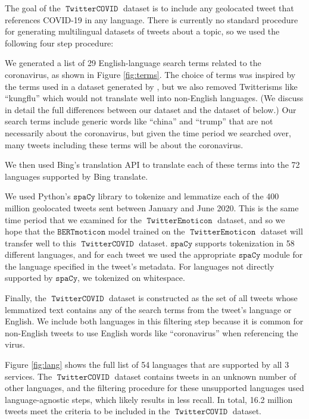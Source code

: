\documentclass[11pt]{article}
\newcommand{\bertmoji}{\texttt{BERTmoticon}}
\newcommand{\spacy}{\texttt{spaCy}}
\DeclareMathOperator{\emoticon}{\texttt{TwitterEmoticon}}
\DeclareMathOperator{\corona}{\texttt{TwitterCOVID}}
\begin{document}
The goal of the $\corona$ dataset is to include any geolocated tweet that references COVID-19 in any language.
There is currently no standard procedure for generating multilingual datasets of tweets about a topic,
so we used the following four step procedure:
\begin{enumerate*}[label=(\arabic*)]
\item
    We generated a list of 29 English-language search terms related to the coronavirus,
    as shown in Figure \ref{fig:terms}.
    The choice of terms was inspired by the terms used in a dataset generated by \citet{chen2020tracking},
    but we also removed Twitterisms like ``kungflu'' which would not translate well into non-English languages.
        (We discuss in detail the full differences between our dataset and the dataset of \citet{chen2020tracking} below.)
    Our search terms include generic words like ``china'' and ``trump'' that are not necessarily about the coronavirus,
    but given the time period we searched over,
    many tweets including these terms will be about the coronavirus.
\item
    We then used Bing's translation API to translate each of these terms into the 72 languages supported by Bing translate.
\item
We used Python's $\spacy$ library \citep{spacy2} to tokenize and lemmatize each of the 400 million geolocated tweets sent between January and June 2020.
This is the same time period that we examined for the $\emoticon$ dataset,
and so we hope that the $\bertmoji$ model trained on the $\emoticon$ dataset will transfer well to this $\corona$ dataset.
$\spacy$ supports tokenization in 58 different languages,
and for each tweet we used the appropriate $\spacy$ module for the language specified in the tweet's metadata.
    For languages not directly supported by $\spacy$,
    we tokenized on whitespace.
\item
Finally, the $\corona$ dataset is constructed as the set of all tweets whose lemmatized text contains any of the search terms from the tweet's language or English.
We include both languages in this filtering step because it is common for non-English tweets to use English words like ``coronavirus'' when referencing the virus.
\end{enumerate*}
Figure \ref{fig:lang} shows the full list of 54 languages that are supported by all 3 services.
The $\corona$ dataset contains tweets in an unknown number of other languages,
and the filtering procedure for these unsupported languages used language-agnostic steps,
which likely results in less recall.
In total, 16.2 million tweets meet the criteria to be included in the $\corona$ dataset.
\end{document}
